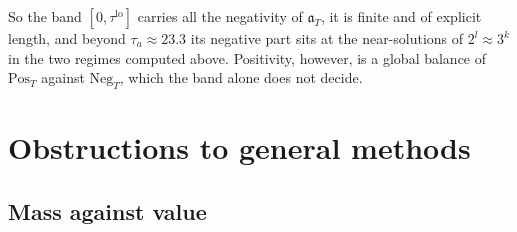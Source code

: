 \documentclass[11pt]{amsart}
\theoremstyle{definition}
\theoremstyle{remark}
\begin{document}
So the band $[0,\tau^{\mathrm{lo}}]$ carries all the negativity of $\mathfrak a_T$, it is finite and of explicit
length, and beyond $\tau_a\approx23.3$ its negative part sits at the near-solutions of $2^l\approx3^k$ in the two
regimes computed above. Positivity, however, is a global balance of $\mathrm{Pos}_T$ against $\mathrm{Neg}_T$, which the
band alone does not decide.


\section{Obstructions to general methods}\label{sec:negative}

\subsection{Mass against value}
\end{document}

